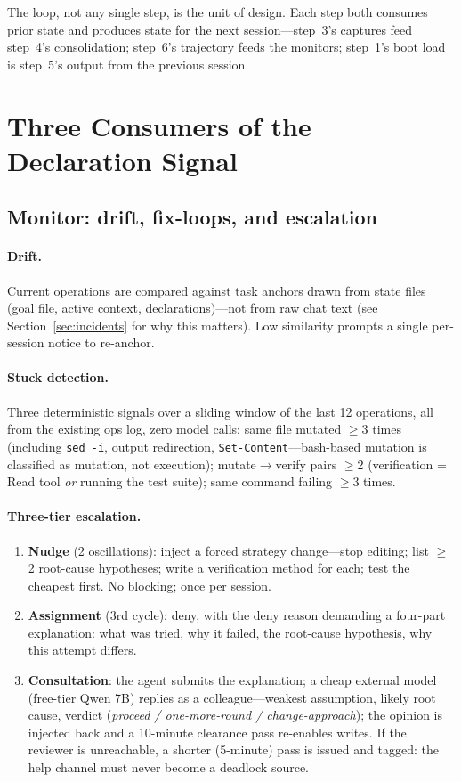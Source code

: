 \documentclass{article}
\begin{document}
The loop, not any single step, is the unit of design. Each step both consumes prior state and produces state for the next session---step~3's captures feed step~4's consolidation; step~6's trajectory feeds the monitors; step~1's boot load is step~5's output from the previous session.

\section{Three Consumers of the Declaration Signal}\label{sec:consumers}

\subsection{Monitor: drift, fix-loops, and escalation}

\paragraph{Drift.} Current operations are compared against task anchors drawn from state files (goal file, active context, declarations)---not from raw chat text (see Section~\ref{sec:incidents} for why this matters). Low similarity prompts a single per-session notice to re-anchor.

\paragraph{Stuck detection.} Three deterministic signals over a sliding window of the last 12 operations, all from the existing ops log, zero model calls: same file mutated $\geq$3 times (including \texttt{sed -i}, output redirection, \texttt{Set-Content}---bash-based mutation is classified as mutation, not execution); mutate$\to$verify pairs $\geq$2 (verification = Read tool \emph{or} running the test suite); same command failing $\geq$3 times.

\paragraph{Three-tier escalation.}
\begin{enumerate}[leftmargin=*,itemsep=1pt]
\item \textbf{Nudge} (2 oscillations): inject a forced strategy change---stop editing; list $\geq$2 root-cause hypotheses; write a verification method for each; test the cheapest first. No blocking; once per session.
\item \textbf{Assignment} (3rd cycle): deny, with the deny reason demanding a four-part explanation: what was tried, why it failed, the root-cause hypothesis, why this attempt differs.
\item \textbf{Consultation}: the agent submits the explanation; a cheap external model (free-tier Qwen 7B) replies as a colleague---weakest assumption, likely root cause, verdict (\emph{proceed / one-more-round / change-approach}); the opinion is injected back and a 10-minute clearance pass re-enables writes. If the reviewer is unreachable, a shorter (5-minute) pass is issued and tagged: the help channel must never become a deadlock source.
\end{enumerate}
\end{document}
